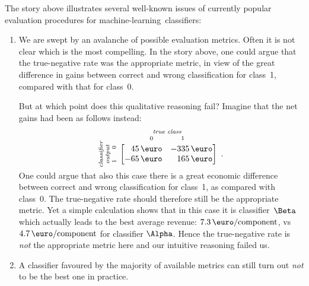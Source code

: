 \documentclass[\ifafour a4paper,12pt,\else a5paper,10pt,\fi%
onecolumn,oneside,article,%
british%
]{memoir}
\theoremstyle{remark}
\theoremstyle{innote}
\renewcommand*{\|}[1][]{\nonscript\:#1\vert\nonscript\:\mathopen{}}
\newcommand*{\ml}{machine-learning}
\begin{document}
The story above illustrates several well-known issues of currently popular evaluation procedures for \ml\ classifiers:
\begin{enumerate}%
\item We are swept by an avalanche of possible evaluation metrics. Often it is not clear which is the most compelling. In the story above, one could argue that the true-negative rate was the appropriate metric, in view of the great difference in gains between correct and wrong classification for class~1, compared with that for class~0.

  But at which point does this qualitative reasoning fail? Imagine that the net gains had been as follows instead:
\begin{equation}
  \label{eq:utility_example_2}
  \rotatebox[origin=c]{90}{
    \clap{\textit{\parbox{5em}{\centering\scriptsize classifier\\output\\$1\hspace{1.5em}0$}}
    }}\ 
    \overbracket[0pt]{
      \begin{bmatrix*}[r]
        45\,\text{\texteuro} & -335\,\text{\texteuro}  \\
        -65\,\text{\texteuro} & 165\,\text{\texteuro}
      \end{bmatrix*}}^{
      \clap{\textit{\parbox{6em}{\centering\scriptsize true class\\$0\hspace{4em}1$}}
    }} \ .
\end{equation}
One could argue that also this case there is a great economic difference between correct and wrong classification for class~1, as compared with class~0. The true-negative rate should therefore still be the appropriate metric. Yet a simple calculation shows that in this case it is classifier~$\Beta$ which actually leads to the best average revenue: $7.3\,\text{\texteuro/component}$, vs $4.7\,\text{\texteuro/component}$ for classifier $\Alpha$. Hence the true-negative rate is \emph{not} the appropriate metric here and our intuitive reasoning failed us.


\item A classifier favoured by the majority of available metrics can still turn out \emph{not} to be the best one in practice.


\end{enumerate}
\end{document}
